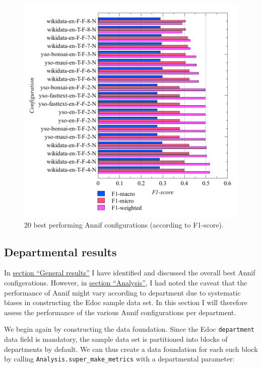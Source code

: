 \begin{figure}
\centering
\includegraphics{images/metrics_f1_top20.pdf}
\caption{20 best performing Annif configurations (according to
F1-score).}
\end{figure}

\hypertarget{departmental-results}{%
\subsection{Departmental results}\label{departmental-results}}

In \protect\hyperlink{general-results}{section ``General results''} I
have identified and discussed the overall best Annif configerations.
However, in \protect\hyperlink{analysis}{section ``Analysis''}, I had
noted the caveat that the performance of Annif might vary according to
department due to systematic biases in constructing the Edoc sample data
set. In this section I will therefore assess the performance of the
various Annif configurations per department.

We begin again by constructing the data foundation. Since the Edoc
\texttt{department} data field is mandatory, the sample data set is
partitioned into blocks of departments by default. We can thus create a
data foundation for each such block by calling
\texttt{Analysis.super\_make\_metrics} with a departmental parameter:

